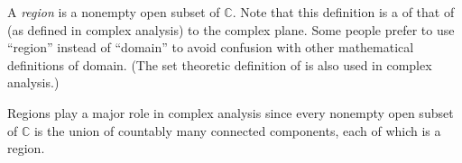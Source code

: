 \documentclass[12pt]{article}
\begin{document}

A \emph{region} is a nonempty open subset of $\mathbb{C}$.  Note that this definition is a  of that of  (as defined in complex analysis) to the complex plane.  Some people prefer to use ``region'' instead of ``domain'' to avoid confusion with other mathematical definitions of domain.  (The set theoretic definition of  is also used in complex analysis.)

Regions play a major role in complex analysis since every nonempty open subset of $\mathbb{C}$ is the union of countably many connected components, each of which is a region.
\end{document}
